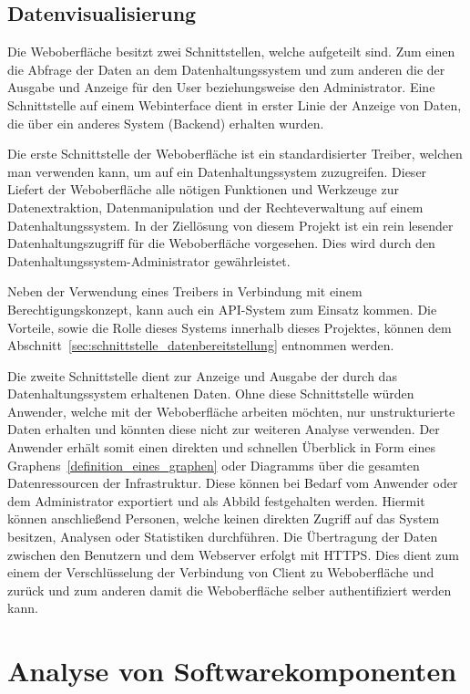 \section{Datenvisualisierung}
Die Weboberfläche besitzt zwei Schnittstellen, welche aufgeteilt sind. Zum
einen die Abfrage der Daten an dem Datenhaltungssystem und zum anderen die der
Ausgabe und Anzeige für den User beziehungsweise den Administrator. Eine
Schnittstelle auf einem Webinterface dient in erster Linie der Anzeige von
Daten, die über ein anderes System (Backend) erhalten wurden.

Die erste Schnittstelle der Weboberfläche ist ein standardisierter Treiber,
welchen man verwenden kann, um auf ein Datenhaltungssystem zuzugreifen. Dieser
Liefert der Weboberfläche alle nötigen Funktionen und Werkzeuge zur
Datenextraktion, Datenmanipulation und der Rechteverwaltung auf einem
Datenhaltungssystem. In der Ziellösung von diesem Projekt ist ein rein lesender
Datenhaltungszugriff für die Weboberfläche vorgesehen. Dies wird durch den
Datenhaltungssystem\hyp{}Administrator gewährleistet.

Neben der Verwendung eines Treibers in Verbindung mit einem
Berechtigungskonzept, kann auch ein API\hyp{}System zum Einsatz kommen. Die
Vorteile, sowie die Rolle dieses Systems innerhalb dieses Projektes, können dem
Abschnitt~\ref{sec:schnittstelle_datenbereitstellung} entnommen werden.

Die zweite Schnittstelle dient zur Anzeige und Ausgabe der durch das
Datenhaltungssystem erhaltenen Daten. Ohne diese Schnittstelle würden Anwender,
welche mit der Weboberfläche arbeiten möchten, nur unstrukturierte Daten
erhalten und könnten diese nicht zur weiteren Analyse verwenden. Der Anwender
erhält somit einen direkten und schnellen Überblick in Form eines
Graphens~\ref{definition_eines_graphen} oder Diagramms über die gesamten
Datenressourcen der Infrastruktur. Diese können bei Bedarf vom Anwender oder
dem Administrator exportiert und als Abbild festgehalten werden. Hiermit können
anschließend Personen, welche keinen direkten Zugriff auf das System besitzen,
Analysen oder Statistiken durchführen. Die Übertragung der Daten zwischen den
Benutzern und dem Webserver erfolgt mit \gls{HTTPS}. Dies dient zum einem der
Verschlüsselung der Verbindung von Client zu Weboberfläche und zurück und zum
anderen damit die Weboberfläche selber authentifiziert werden kann.
\mr%

\chapter{Analyse von Softwarekomponenten}
